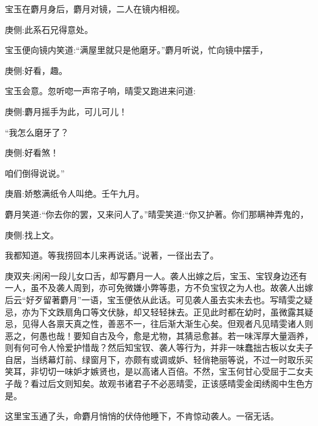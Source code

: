\begin{parag}
    宝玉在麝月身后，麝月对镜，二人在镜内相视。\begin{note}庚侧:此系石兄得意处。\end{note}宝玉便向镜内笑道:“满屋里就只是他磨牙。”麝月听说，忙向镜中摆手，\begin{note}庚侧:好看，趣。\end{note}宝玉会意。忽听唿一声帘子响，晴雯又跑进来问道:\begin{note}庚侧:麝月摇手为此，可儿可儿！\end{note}“我怎么磨牙了？\begin{note}庚侧:好看煞！\end{note}咱们倒得说说。”\begin{note}庚眉:娇憨满纸令人叫绝。壬午九月。\end{note}麝月笑道:“你去你的罢，又来问人了。”晴雯笑道:“你又护著。你们那瞒神弄鬼的，\begin{note}庚侧:找上文。\end{note}我都知道。等我捞回本儿来再说话。”说著，一径出去了。\begin{note}庚双夹:闲闲一段儿女口舌，却写麝月一人。袭人出嫁之后，宝玉、宝钗身边还有一人，虽不及袭人周到，亦可免微嫌小弊等患，方不负宝钗之为人也。故袭人出嫁后云“好歹留著麝月”一语，宝玉便依从此话。可见袭人虽去实未去也。写晴雯之疑忌，亦为下文跌扇角口等文伏脉，却又轻轻抹去。正见此时都在幼时，虽微露其疑忌，见得人各禀天真之性，善恶不一，往后渐大渐生心矣。但观者凡见晴雯诸人则恶之，何愚也哉！要知自古及今，愈是尤物，其猜忌愈甚。若一味浑厚大量涵养，则有何可令人怜爱护惜哉？然后知宝钗、袭人等行为，并非一味蠢拙古板以女夫子自居，当绣幕灯前、绿窗月下，亦颇有或调或妒、轻俏艳丽等说，不过一时取乐买笑耳，非切切一味妒才嫉贤也，是以高诸人百倍。不然，宝玉何甘心受屈于二女夫子哉？看过后文则知矣。故观书诸君子不必恶晴雯，正该感晴雯金闺绣阁中生色方是。\end{note}这里宝玉通了头，命麝月悄悄的伏侍他睡下，不肯惊动袭人。一宿无话。
\end{parag}


